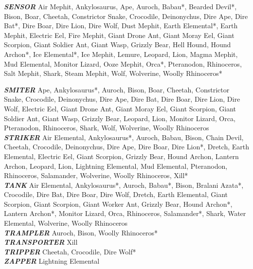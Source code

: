 \textbf{\textit{SENSOR}} Air Mephit, Ankylosaurus, Ape, Auroch, Babau*, Bearded Devil*, Bison, Boar, Cheetah, Constrictor Snake, Crocodile, Deinonychus, Dire Ape, Dire Bat*, Dire Boar, Dire Lion, Dire Wolf, Dust Mephit, Earth Elemental*, Earth Mephit, Electric Eel, Fire Mephit, Giant Drone Ant, Giant Moray Eel, Giant Scorpion, Giant Soldier Ant, Giant Wasp, Grizzly Bear, Hell Hound, Hound Archon*, Ice Elemental*, Ice Mephit, Lemure, Leopard, Lion, Magma Mephit, Mud Elemental, Monitor Lizard, Ooze Mephit, Orca*, Pteranodon, Rhinoceros, Salt Mephit, Shark, Steam Mephit, Wolf, Wolverine, Woolly Rhinoceros* \\

\newpage

\textbf{\textit{SMITER}} Ape, Ankylosaurus*, Auroch, Bison, Boar, Cheetah, Constrictor Snake, Crocodile, Deinonychus, Dire Ape, Dire Bat, Dire Boar, Dire Lion, Dire Wolf, Electric Eel, Giant Drone Ant, Giant Moray Eel, Giant Scorpion, Giant Soldier Ant, Giant Wasp, Grizzly Bear, Leopard, Lion, Monitor Lizard, Orca, Pteranodon, Rhinoceros, Shark, Wolf, Wolverine, Woolly Rhinoceros \\

\textbf{\textit{STRIKER}} Air Elemental, Ankylosaurus*, Auroch, Babau, Bison, Chain Devil, Cheetah, Crocodile, Deinonychus, Dire Ape, Dire Boar, Dire Lion*, Dretch, Earth Elemental, Electric Eel, Giant Scorpion, Grizzly Bear, Hound Archon, Lantern Archon, Leopard, Lion, Lightning Elemental, Mud Elemental, Pteranodon, Rhinoceros, Salamander, Wolverine, Woolly Rhinoceros, Xill* \\

\textbf{\textit{TANK}} Air Elemental, Ankylosaurus*, Auroch, Babau*, Bison, Bralani Azata*, Crocodile, Dire Bat, Dire Boar, Dire Wolf, Dretch, Earth Elemental, Giant Scorpion, Giant Scorpion, Giant Worker Ant, Grizzly Bear, Hound Archon*, Lantern Archon*, Monitor Lizard, Orca, Rhinoceros, Salamander*, Shark, Water Elemental, Wolverine, Woolly Rhinoceros \\

\textbf{\textit{TRAMPLER}} Auroch, Bison, Woolly Rhinoceros* \\

\textbf{\textit{TRANSPORTER}} Xill \\

\textbf{\textit{TRIPPER}} Cheetah, Crocodile, Dire Wolf*  \\

\textbf{\textit{ZAPPER}} Lightning Elemental \\

